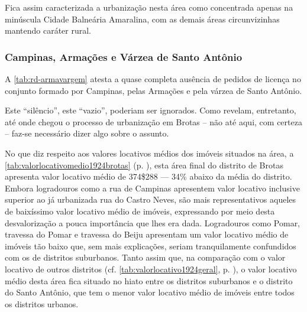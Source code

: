 
Fica assim caracterizada a urbanização nesta área como concentrada apenas na minúscula Cidade Balneária Amaralina, com as demais áreas circunvizinhas mantendo caráter rural.

\subsubsection{Campinas, Armações e Várzea de Santo Antônio}\label{subsubsec:campinas}


A \autoref{tab:rd-armavargem} atesta a quase completa ausência de pedidos de licença no conjunto formado por Campinas, pelas Armações e pela várzea de Santo Antônio.





Este ``silêncio'', este ``vazio'', poderiam ser ignorados. Como revelam, entretanto, até onde chegou o processo de urbanização em Brotas -- não até aqui, com certeza -- faz-se necessário dizer algo sobre o assunto. 


No que diz respeito aos valores locativos médios dos imóveis situados na área, a \autoref{tab:valorlocativomedio1924brotas} (p. \pageref{tab:valorlocativomedio1924brotas}), esta área final do distrito de Brotas apresenta valor locativo médio de 374\$288 --- 34\% abaixo da média do distrito. Embora logradouros como a rua de Campinas apresentem valor locativo inclusive superior ao já urbanizada rua do Castro Neves, são mais representativos aqueles de baixíssimo valor locativo médio de imóveis, expressando por meio desta desvalorização a pouca importância que lhes era dada. Logradouros como Pomar, travessa do Pomar e travessa do Beiju apresentam um valor locativo médio de imóveis tão baixo que, sem mais explicações, seriam tranquilamente confundidos com os de distritos suburbanos.  Tanto assim que, na comparação com o valor locativo de outros distritos (cf. \autoref{tab:valorlocativo1924geral}, p. \pageref{tab:valorlocativo1924geral}), o valor locativo médio desta área fica situado no hiato entre os distritos suburbanos e o distrito do Santo Antônio, que tem o menor valor locativo médio de imóveis entre todos os distritos urbanos.

